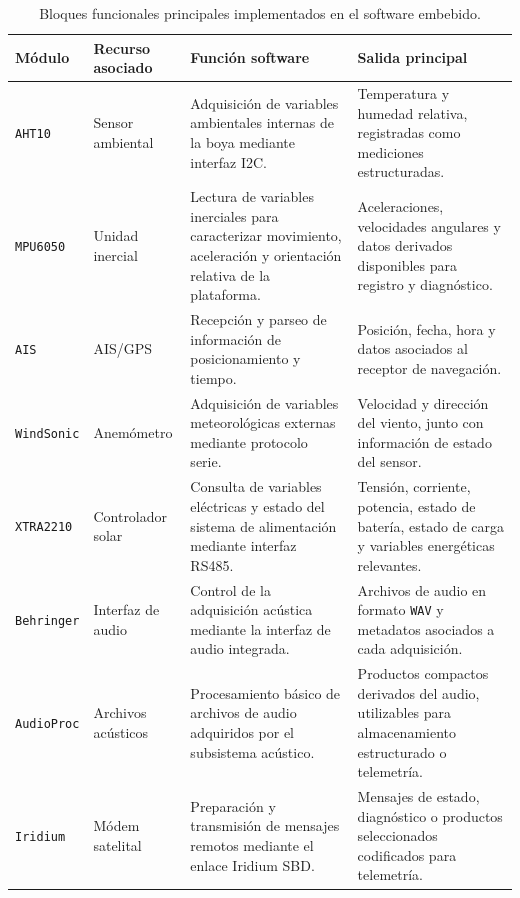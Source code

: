 \begin{table}[htbp]
\centering
\caption{Bloques funcionales principales implementados en el software embebido.}
\label{tab:bloques_funcionales_software}
\footnotesize
\begin{tabularx}{\textwidth}{l l X X}
\toprule
\textbf{Módulo} & \textbf{Recurso asociado} & \textbf{Función software} & \textbf{Salida principal} \\
\midrule

\texttt{AHT10} &
Sensor ambiental &
Adquisición de variables ambientales internas de la boya mediante interfaz I2C. &
Temperatura y humedad relativa, registradas como mediciones estructuradas. \\

\texttt{MPU6050} &
Unidad inercial &
Lectura de variables inerciales para caracterizar movimiento, aceleración y orientación relativa de la plataforma. &
Aceleraciones, velocidades angulares y datos derivados disponibles para registro y diagnóstico. \\

\texttt{AIS} &
AIS/GPS &
Recepción y parseo de información de posicionamiento y tiempo. &
Posición, fecha, hora y datos asociados al receptor de navegación. \\

\texttt{WindSonic} &
Anemómetro &
Adquisición de variables meteorológicas externas mediante protocolo serie. &
Velocidad y dirección del viento, junto con información de estado del sensor. \\

\texttt{XTRA2210} &
Controlador solar &
Consulta de variables eléctricas y estado del sistema de alimentación mediante interfaz RS485. &
Tensión, corriente, potencia, estado de batería, estado de carga y variables energéticas relevantes. \\

\texttt{Behringer} &
Interfaz de audio &
Control de la adquisición acústica mediante la interfaz de audio integrada. &
Archivos de audio en formato \texttt{WAV} y metadatos asociados a cada adquisición. \\

\texttt{AudioProc} &
Archivos acústicos &
Procesamiento básico de archivos de audio adquiridos por el subsistema acústico. &
Productos compactos derivados del audio, utilizables para almacenamiento estructurado o telemetría. \\

\texttt{Iridium} &
Módem satelital &
Preparación y transmisión de mensajes remotos mediante el enlace Iridium SBD. &
Mensajes de estado, diagnóstico o productos seleccionados codificados para telemetría. \\

\bottomrule
\end{tabularx}
\end{table}

